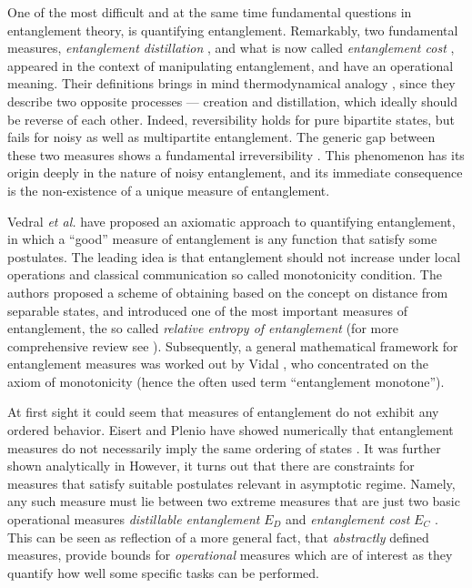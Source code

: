 \documentclass[twocolumn,aps,rmp]{revtex4}
\begin{document}
One of the most difficult and at the same time fundamental questions
in entanglement theory, is quantifying entanglement. Remarkably, two
fundamental measures, {\it entanglement distillation}
\cite{BBPS1996,BBPSSW1996,BDSW1996}, and what is now called {\it
  entanglement cost} \cite{BDSW1996,cost}, appeared in the context of
manipulating entanglement, and have an operational meaning. Their
definitions brings in mind thermodynamical analogy
\cite{popescu-rohrlich,PlenioVedral1998,termo}, since they describe
two opposite processes --- creation and distillation, which ideally
should be reverse of each other. Indeed, reversibility holds for pure
bipartite states, but fails for noisy as well as multipartite
entanglement. The generic gap between these two measures shows a
fundamental irreversibility
\cite{bound,YangHHS2005-cost,VidalC-irre}. This phenomenon has its
origin deeply in the nature of noisy entanglement, and its immediate
consequence is the non-existence of a unique measure of entanglement.

Vedral \emph{et al.} \cite{VPRK1997,PlenioVedral1998} have proposed an
axiomatic approach to quantifying entanglement, in which a ``good''
measure of entanglement is any function that satisfy some
postulates. The leading idea \cite{BDSW1996} is that entanglement
should not increase under local operations and classical communication
so called monotonicity condition. The authors proposed a scheme of
obtaining based on the concept on distance from separable states, and
introduced one of the most important measures of entanglement, the so
called {\it relative entropy of entanglement}
\cite{VPRK1997,PlenioVedral1998} (for more comprehensive review see
\cite{Vedral2002-rmp}). Subsequently, a general mathematical framework
for entanglement measures was worked out by Vidal
\cite{Vidal-mon2000}, who concentrated on the axiom of monotonicity
(hence the often used term ``entanglement monotone'').


At first sight it could seem that measures of entanglement do not
exhibit any ordered behavior. Eisert and Plenio have showed
numerically that entanglement measures do not necessarily imply the
same ordering of states \cite{EisertPlenio_order}. It was further
shown analytically in \cite{GrudkaMiranowicz_order}
However, it turns out that there are constraints for measures that
satisfy suitable postulates relevant in asymptotic regime. Namely, any
such measure must lie between two extreme measures that are just two
basic operational measures {\it distillable entanglement} $E_D$ and
{\it entanglement cost} $E_C$ \cite{limits}. This can be seen as
reflection of a more general fact, that {\it abstractly} defined
measures, provide bounds for {\it operational} measures which are of
interest as they quantify how well some specific tasks can be
performed.
\end{document}
